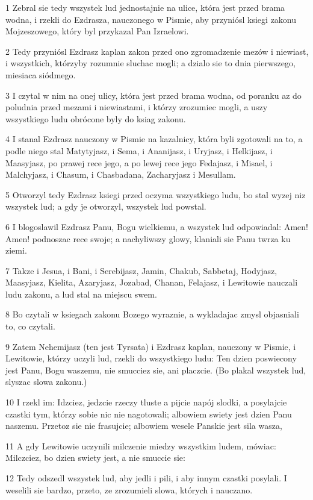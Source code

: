 \par 1 Zebral sie tedy wszystek lud jednostajnie na ulice, która jest przed brama wodna, i rzekli do Ezdrasza, nauczonego w Pismie, aby przyniósl ksiegi zakonu Mojzeszowego, który byl przykazal Pan Izraelowi.
\par 2 Tedy przyniósl Ezdrasz kaplan zakon przed ono zgromadzenie mezów i niewiast, i wszystkich, którzyby rozumnie sluchac mogli; a dzialo sie to dnia pierwszego, miesiaca siódmego.
\par 3 I czytal w nim na onej ulicy, która jest przed brama wodna, od poranku az do poludnia przed mezami i niewiastami, i którzy zrozumiec mogli, a uszy wszystkiego ludu obrócone byly do ksiag zakonu.
\par 4 I stanal Ezdrasz nauczony w Pismie na kazalnicy, która byli zgotowali na to, a podle niego stal Matytyjasz, i Sema, i Ananijasz, i Uryjasz, i Helkijasz, i Maasyjasz, po prawej rece jego, a po lewej rece jego Fedajasz, i Misael, i Malchyjasz, i Chasum, i Chasbadana, Zacharyjasz i Mesullam.
\par 5 Otworzyl tedy Ezdrasz ksiegi przed oczyma wszystkiego ludu, bo stal wyzej niz wszystek lud; a gdy je otworzyl, wszystek lud powstal.
\par 6 I blogoslawil Ezdrasz Panu, Bogu wielkiemu, a wszystek lud odpowiadal: Amen! Amen! podnoszac rece swoje; a nachyliwszy glowy, klaniali sie Panu twrza ku ziemi.
\par 7 Takze i Jesua, i Bani, i Serebijasz, Jamin, Chakub, Sabbetaj, Hodyjasz, Maasyjasz, Kielita, Azaryjasz, Jozabad, Chanan, Felajasz, i Lewitowie nauczali ludu zakonu, a lud stal na miejscu swem.
\par 8 Bo czytali w ksiegach zakonu Bozego wyraznie, a wykladajac zmysl objasniali to, co czytali.
\par 9 Zatem Nehemijasz (ten jest Tyrsata) i Ezdrasz kaplan, nauczony w Pismie, i Lewitowie, którzy uczyli lud, rzekli do wszystkiego ludu: Ten dzien poswiecony jest Panu, Bogu waszemu, nie smucciez sie, ani placzcie. (Bo plakal wszystek lud, slyszac slowa zakonu.)
\par 10 I rzekl im: Idzciez, jedzcie rzeczy tluste a pijcie napój slodki, a posylajcie czastki tym, którzy sobie nic nie nagotowali; albowiem swiety jest dzien Panu naszemu. Przetoz sie nie frasujcie; albowiem wesele Panskie jest sila wasza,
\par 11 A gdy Lewitowie uczynili milczenie miedzy wszystkim ludem, mówiac: Milczciez, bo dzien swiety jest, a nie smuccie sie:
\par 12 Tedy odszedl wszystek lud, aby jedli i pili, i aby innym czastki posylali. I weselili sie bardzo, przeto, ze zrozumieli slowa, których i nauczano.
